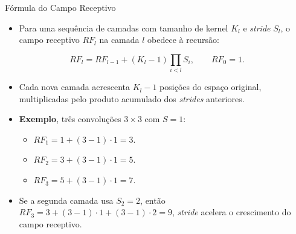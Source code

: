 \documentclass[aspectratio=169,xcolor=dvipsnames]{beamer}
\begin{document}
\begin{frame}{Fórmula do Campo Receptivo}
\begin{itemize}
    \item Para uma sequência de camadas com tamanho de kernel $K_l$ e \textit{stride} $S_l$, o campo receptivo $RF_l$ na camada $l$ obedece à recursão:
\end{itemize}
\begin{equation*}
    RF_l = RF_{l-1} + (K_l - 1) \prod_{i<l} S_i, \qquad RF_0 = 1.
\end{equation*}
\begin{itemize}
    \item Cada nova camada acrescenta $K_l - 1$ posições do espaço original, multiplicadas pelo produto acumulado dos \textit{strides} anteriores.
    \item \textbf{Exemplo}, três convoluções $3\times 3$ com $S=1$:
    \begin{itemize}
        \item $RF_1 = 1 + (3-1)\cdot 1 = 3$.
        \item $RF_2 = 3 + (3-1)\cdot 1 = 5$.
        \item $RF_3 = 5 + (3-1)\cdot 1 = 7$.
    \end{itemize}
    \item Se a segunda camada usa $S_2 = 2$, então $RF_3 = 3 + (3-1)\cdot 1 + (3-1)\cdot 2 = 9$, \textit{stride} acelera o crescimento do campo receptivo.
\end{itemize}
\end{frame}

\newcommand{\rfgrade}[3]{%
    \pgfmathsetmacro{\rfh}{#3*0.5}%
    \pgfmathsetmacro{\rfylo}{#2-\rfh/2}%
    \pgfmathsetmacro{\rfyhi}{#2+\rfh/2}%
    \pgfmathsetmacro{\rfxhi}{#1+\rfh}%
    \fill[black!25] (#1,\rfylo) rectangle (\rfxhi,\rfyhi);
    \draw[gray!60, step=0.5, shift={(#1,\rfylo)}] (0,0) grid (\rfh,\rfh);
    \draw[thick, BrickRed] (#1,\rfylo) rectangle (\rfxhi,\rfyhi);
}
\newcommand{\rfcone}[5]{%
    \pgfmathsetmacro{\rfha}{#3*0.25}%
    \pgfmathsetmacro{\rfhb}{#5*0.25}%
    \fill[gray!25, opacity=0.6] (#1,#2+\rfha) -- (#1,#2-\rfha) -- (#4,#2-\rfhb) -- (#4,#2+\rfhb) -- cycle;
}
\end{document}
